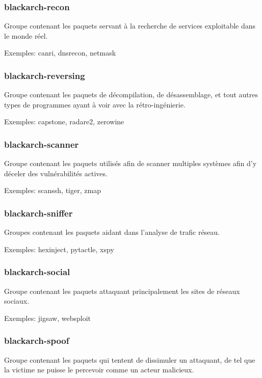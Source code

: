 \documentclass[a4paper, oneside, 11pt]{book}
\begin{document}
\subsubsection{blackarch-recon}

Groupe contenant les paquets servant à la recherche de services exploitable dans
le monde réel.

Exemples: canri, dnsrecon, netmask

\subsubsection{blackarch-reversing}

Groupe contenant les paquets de décompilation, de désassemblage, et tout autres
types de programmes ayant à voir avec la rétro-ingénierie. 

Exemples: capstone, radare2, zerowine

\subsubsection{blackarch-scanner}

Groupe contenant les paquets utilisés afin de scanner multiples systèmes afin
d'y déceler des vulnérabilités actives.

Exemples: scanssh, tiger, zmap

\subsubsection{blackarch-sniffer}

Groupes contenant les paquets aidant dans l'analyse de trafic réseau.

Exemples: hexinject, pytactle, xspy

\subsubsection{blackarch-social}

Groupe contenant les paquets attaquant principalement les sites de réseaux
sociaux.

Exemples: jigsaw, websploit

\subsubsection{blackarch-spoof}

Groupe contenant les paquets qui tentent de dissimuler un attaquant, de tel que
la victime ne puisse le percevoir comme un acteur malicieux.
\end{document}
